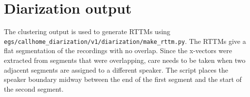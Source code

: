 \section{Diarization output}
The clustering output is used to generate RTTMs using \texttt{egs/callhome\_diarization/v1/diarization/make\_rttm.py}. The RTTMs give a flat segmentation of the recordings with no overlap. Since the x-vectors were extracted from segments that were overlapping, care needs to be taken when two adjacent segments are assigned to a different speaker. The script places the speaker boundary midway between the end of the first segment and the start of the second segment.




